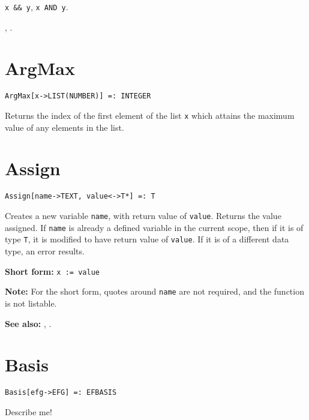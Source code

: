 \shortform \verb+x && y+, \verb+x AND y+.

\seealso {}, .


\section*{ArgMax}\label{PrimArgMax}
\begin{verbatim}
ArgMax[x->LIST(NUMBER)] =: INTEGER 
\end{verbatim}

Returns the index of the first element of the list \verb+x+ which
attains the maximum value of any elements in the list.  


\section*{Assign}\label{PrimAssign}
\begin{verbatim}
Assign[name->TEXT, value<->T*] =: T
\end{verbatim}
\foralltypes

Creates a new variable \verb+name+, with return value of \verb+value+.
Returns the value assigned.  If \verb+name+ is already a defined
variable in the current scope, then if it is of type \verb+T+, it is
modified to have return value of \verb+value+.  If it is of a
different data type, an error results.

\textbf{Short form:} \verb+x := value+

\textbf{Note:} For the short form, quotes around \verb+name+ are not
required, and the function is not listable.

\textbf{See also:} ,
.


\section*{Basis}\label{PrimBasis}
\begin{verbatim}
Basis[efg->EFG] =: EFBASIS
\end{verbatim}

\noindent Describe me!


